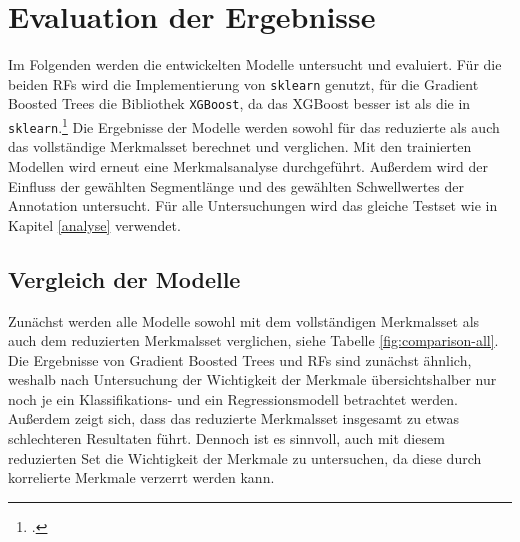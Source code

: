 \chapter{Evaluation der Ergebnisse}\label{evaluation}

Im Folgenden werden die entwickelten Modelle untersucht und evaluiert. Für die beiden \acl{RF}s wird die Implementierung von \texttt{sklearn} genutzt, für die Gradient Boosted Trees die Bibliothek \texttt{XGBoost}, da das \ac{XGBoost} besser ist als die in \texttt{sklearn}.\footcite[Kapitel 10]{Harrison2019} Die Ergebnisse der Modelle werden sowohl für das reduzierte als auch das vollständige Merkmalsset berechnet und verglichen. Mit den trainierten Modellen wird erneut eine Merkmalsanalyse durchgeführt. Außerdem wird der Einfluss der gewählten Segmentlänge und des gewählten Schwellwertes der Annotation untersucht. Für alle Untersuchungen wird das gleiche Testset wie in Kapitel \ref{analyse} verwendet.

\section{Vergleich der Modelle}

Zunächst werden alle Modelle sowohl mit dem vollständigen Merkmalsset als auch dem reduzierten Merkmalsset verglichen, siehe Tabelle \ref{fig:comparison-all}. Die Ergebnisse von Gradient Boosted Trees und \acl{RF}s sind zunächst ähnlich, weshalb nach Untersuchung der Wichtigkeit der Merkmale übersichtshalber nur noch je ein Klassifikations- und ein Regressionsmodell betrachtet werden. Außerdem zeigt sich, dass das reduzierte Merkmalsset insgesamt zu etwas schlechteren Resultaten führt. Dennoch ist es sinnvoll, auch mit diesem reduzierten Set die Wichtigkeit der Merkmale zu untersuchen, da diese durch korrelierte Merkmale verzerrt werden kann.
	
